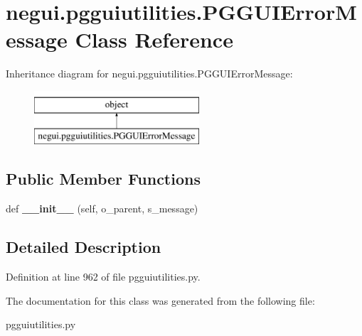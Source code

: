 \hypertarget{classnegui_1_1pgguiutilities_1_1PGGUIErrorMessage}{}\section{negui.\+pgguiutilities.\+P\+G\+G\+U\+I\+Error\+Message Class Reference}
\label{classnegui_1_1pgguiutilities_1_1PGGUIErrorMessage}
Inheritance diagram for negui.\+pgguiutilities.\+P\+G\+G\+U\+I\+Error\+Message\+:\begin{figure}[H]
\begin{center}
\leavevmode
\includegraphics[height=2.000000cm]{classnegui_1_1pgguiutilities_1_1PGGUIErrorMessage}
\end{center}
\end{figure}
\subsection*{Public Member Functions}
\begin{DoxyCompactItemize}
\item 
def {\bfseries \+\_\+\+\_\+init\+\_\+\+\_\+} (self, o\+\_\+parent, s\+\_\+message)\hypertarget{classnegui_1_1pgguiutilities_1_1PGGUIErrorMessage_a420fb489448327d2a25e10f35a6c3589}{}\label{classnegui_1_1pgguiutilities_1_1PGGUIErrorMessage_a420fb489448327d2a25e10f35a6c3589}

\end{DoxyCompactItemize}


\subsection{Detailed Description}


Definition at line 962 of file pgguiutilities.\+py.



The documentation for this class was generated from the following file\+:\begin{DoxyCompactItemize}
\item 
pgguiutilities.\+py\end{DoxyCompactItemize}
